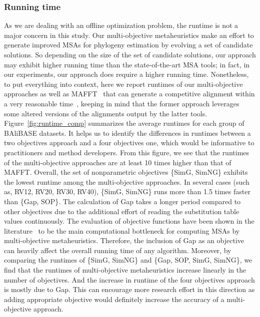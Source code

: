 \subsubsection{Running time}
As we are dealing with an offline optimization problem, the runtime is not a major concern in this study. Our multi-objective metaheuristics make an effort to generate improved MSAs for phylogeny estimation by evolving a set of candidate solutions. So depending on the size of the set of candidate solutions, our approach may exhibit higher running time than the state-of-the-art MSA tools; in fact, in our experiments, our approach does require a higher running time. Nonetheless, to put everything into context, here we report runtimes of our multi-objective approaches as well as MAFFT~\citep{katoh2002mafft} that can generate a competitive alignment within a very reasonable time~\citep{ashkenazy2018multiple}, keeping in mind that the former approach leverages some altered versions of the alignments output by the latter tools. Figure~\ref{fig:runtime_comp} summarizes the average runtimes for each group of BAliBASE datasets. It helps us to identify the differences in runtimes between a two objectives approach and a four objectives one, which would be informative to practitioners and method developers. From this figure, we see that the runtimes of the multi-objective approaches are at least 10 times higher than that of MAFFT. Overall, the set of nonparametric objectives \{SimG, SimNG\} exhibits the lowest runtime among the multi-objective approaches. In several cases (such as, RV12, RV20, RV30, RV40), \{SimG, SimNG\} runs more than 1.5 times faster than \{Gap, SOP\}. The calculation of Gap takes a longer period compared to other objectives due to the additional effort of reading the substitution table values continuously. The evaluation of objective functions have been shown in the literature~\citep{zambrano2017m2align} to be the main computational bottleneck for computing MSAs by multi-objective metaheuristics. Therefore, the inclusion of Gap as an objective can heavily affect the overall running time of any algorithm. Moreover, by comparing the runtimes of \{SimG, SimNG\} and \{Gap, SOP, SimG, SimNG\}, we find that the runtimes of multi-objective metaheuristics increase linearly in the number of objectives. And the increase in runtime of the four objectives approach is mostly due to Gap. This can encourage more research effort in this direction as adding appropriate objective would definitely increase the accuracy of a multi-objective approach.
